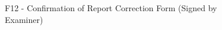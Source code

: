 \begin{figure}[h]
    \centering
    \setlength{\fboxsep}{0pt}
    \caption{F12 - Confirmation of Report Correction Form (Signed by Examiner)}
    \label{fig:myfig100}
\end{figure}
\clearpage
